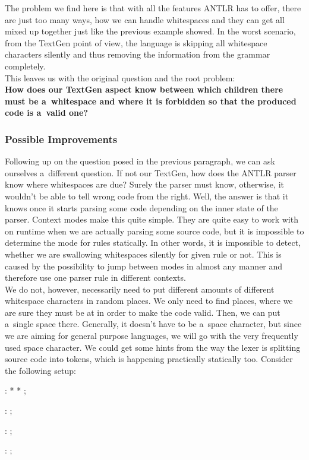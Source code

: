 The problem we find here is that with all the features ANTLR has to offer, there are just too many ways, how we can handle whitespaces and they can get all mixed up together just like the previous example showed.
In the worst scenario, from the TextGen point of view, the language is skipping all whitespace characters silently and thus removing the information from the grammar completely.
\\

This leaves us with the original question and the root problem:
\\
\textbf{How does our TextGen aspect know between which children there must be a~whitespace and where it is forbidden so that the produced code is a~valid one?}

\subsubsection{Possible Improvements}

Following up on the question posed in the previous paragraph, we can ask ourselves a~different question.
If not our TextGen, how does the ANTLR parser know where whitespaces are due?
Surely the parser must know, otherwise, it wouldn't be able to tell wrong code from the right.
Well, the answer is that it knows once it starts parsing some code depending on the inner state of the parser.
Context modes make this quite simple.
They are quite easy to work with on runtime when we are actually parsing some source code, but it is impossible to determine the mode for rules statically.
In other words, it is impossible to detect, whether we are swallowing whitespaces silently for given rule or not.
This is caused by the possibility to jump between modes in almost any manner and therefore use one parser rule in different contexts.
\\

We do not, however, necessarily need to put different amounts of different whitespace characters in random places.
We only need to find places, where we are sure they must be at in order to make the code valid.
Then, we can put a~single space there.
Generally, it doesn't have to be a~space character, but since we are aiming for general purpose languages, we will go with the very frequently used space character.
We could get some hints from the way the lexer is splitting source code into tokens, which is happening practically statically too.
Consider the following setup:

\begin{antlr}
	    :   \literal{<}  * \literal{>} * \literal{</}  \literal{>} ;

	  :       ;

	       :    ;

	       :   \regex{~[<"]*} ;
\end{antlr}

